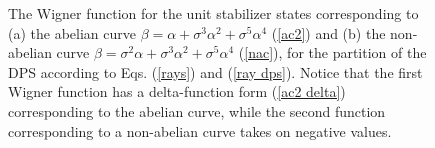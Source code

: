 \documentclass[quantumrep,article,submit,pdftex,moreauthors]{Definitions/mdpi}
\providecommand{\DIFadd}[1]{{\protect\color{blue}\uwave{#1}}} %
\providecommand{\DIFdel}[1]{{\protect\color{red}\sout{#1}}}                      %
\providecommand{\DIFaddFL}[1]{\DIFadd{#1}} %
\providecommand{\DIFdelFL}[1]{\DIFdel{#1}} %
\providecommand{\DIFaddbeginFL}{} %
\providecommand{\DIFaddendFL}{} %
\providecommand{\DIFdelbeginFL}{} %
\providecommand{\DIFdelendFL}{} %
\begin{document}
\begin{figure}[ht]
  \centering
  \DIFdelbeginFL %
\DIFdelendFL \DIFaddbeginFL {}
  \DIFaddendFL \quad 
  \DIFdelbeginFL %
\DIFdelendFL \DIFaddbeginFL {}
  \DIFaddendFL \caption{
    The Wigner function for the unit stabilizer states corresponding to (a) the
    abelian curve \DIFdelbeginFL \DIFdelFL{$\beta = \alpha + \sigma^3 \alpha^2 + \sigma^5
		\alpha^4$ }\DIFdelendFL \DIFaddbeginFL \DIFaddFL{$\protect\beta = \protect\alpha + \protect\sigma^3
    \protect\alpha^2 + \protect\sigma^5 \protect\alpha^4$ }\DIFaddendFL (\DIFaddbeginFL \protect\DIFaddendFL \ref{ac2})
    and (b) the non-abelian curve \DIFdelbeginFL \DIFdelFL{$\beta = \sigma^2
		\alpha + \sigma^3 \alpha^2 + \sigma^{5}\alpha^{4}$ }\DIFdelendFL \DIFaddbeginFL \DIFaddFL{$\protect\beta = \protect\sigma^2 \protect
    \alpha + \protect\sigma^3 \protect\alpha^2 +
    \protect\sigma^{5}\protect\alpha^{4}$ }\DIFaddendFL (\DIFaddbeginFL \protect\DIFaddendFL \ref{nac}), for the partition
    of the DPS according to Eqs. (\DIFaddbeginFL \protect\DIFaddendFL \ref{rays}) and (\DIFaddbeginFL \protect\DIFaddendFL \ref{ray
    dps}). Notice that the first Wigner function has a delta-function form
    (\DIFaddbeginFL \protect\DIFaddendFL \ref{ac2 delta}) corresponding to the abelian curve, while the
    second function corresponding to a non-abelian curve takes on negative
    values.
  }
  \DIFdelbeginFL %
\DIFdelendFL \DIFaddbeginFL \label{fig2}
\DIFaddendFL \end{figure}
\end{document}

